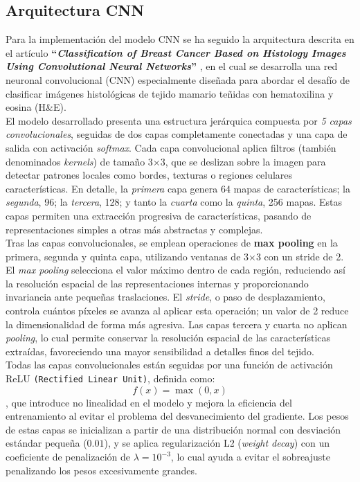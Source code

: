 \documentclass[12pt]{article} %
\begin{document}
\subsection{Arquitectura CNN}
Para la implementación del modelo CNN se ha seguido la arquitectura descrita en el artículo \textbf{“\textit{Classification of Breast Cancer Based on Histology Images Using Convolutional Neural Networks}”} \cite{bardou2018classification}, en el cual se desarrolla una red neuronal convolucional (CNN) especialmente diseñada para abordar el desafío de clasificar imágenes histológicas de tejido mamario teñidas con hematoxilina y eosina (H\&E).\\

El modelo desarrollado presenta una estructura jerárquica compuesta por \textit{5 capas convolucionales}, seguidas de dos capas completamente conectadas y una capa de salida con activación \textit{softmax}. Cada capa convolucional aplica filtros (también denominados \textit{kernels}) de tamaño 3×3, que se deslizan sobre la imagen para detectar patrones locales como bordes, texturas o regiones celulares características. En detalle, la \textit{primera} capa genera 64 mapas de características; la \textit{segunda}, 96; la \textit{tercera}, 128; y tanto la \textit{cuarta} como la \textit{quinta}, 256 mapas. Estas capas permiten una extracción progresiva de características, pasando de representaciones simples a otras más abstractas y complejas.\\

Tras las capas convolucionales, se emplean operaciones de \textbf{max pooling} en la primera, segunda y quinta capa, utilizando ventanas de 3×3 con un stride de 2. El \textit{max pooling} selecciona el valor máximo dentro de cada región, reduciendo así la resolución espacial de las representaciones internas y proporcionando invariancia ante pequeñas traslaciones. El \textit{stride}, o paso de desplazamiento, controla cuántos píxeles se avanza al aplicar esta operación; un valor de 2 reduce la dimensionalidad de forma más agresiva. Las capas tercera y cuarta no aplican \textit{pooling}, lo cual permite conservar la resolución espacial de las características extraídas, favoreciendo una mayor sensibilidad a detalles finos del tejido. \\

Todas las capas convolucionales están seguidas por una función de activación ReLU \texttt{(Rectified Linear Unit)}, definida como: \begin{equation} f(x) = \max(0, x) \end{equation}, que introduce no linealidad en el modelo y mejora la eficiencia del entrenamiento al evitar el problema del desvanecimiento del gradiente. Los pesos de estas capas se inicializan a partir de una distribución normal con desviación estándar pequeña ($0.01$), y se aplica regularización L2 (\textit{weight decay}) con un coeficiente de penalización de $\lambda = 10^{-3}$, lo cual ayuda a evitar el sobreajuste penalizando los pesos excesivamente grandes.\\
\end{document}
